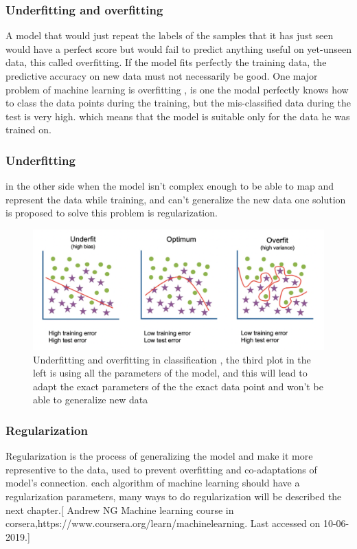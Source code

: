 \subsubsection{Underfitting and overfitting}
A model that would just repeat the labels of the samples that it has just seen would have a perfect score but would fail to predict anything useful on yet-unseen data, this called overfitting. If the model fits perfectly the training data, the predictive accuracy on new data must not necessarily be good. One major problem of machine learning is overfitting , is one the modal perfectly knows how to class the data points during the training, but the mis-classified data during the test is very high. which means that the model is suitable only for the data he was trained on. 
\subsubsection{Underfitting}
in the other side when the model isn’t complex enough to be able to map and represent the data while training, and can’t generalize the new data one solution is proposed to solve this problem is regularization.\cite{book3}
\begin{figure}[!h]
    \centering
    \includegraphics[width=1\textwidth]{chapters/chapter02/fig02/overfiting.png}
    \caption{Underfitting and overfitting in classification , the third plot in the left is using all the parameters of the model, and this will lead to adapt the exact parameters of the the exact data point and won’t be able to generalize new data
}
    \label{fig:my_label}
\end{figure}
\subsubsection{Regularization}
Regularization is the process of generalizing the model and make it more representive to the data, used to prevent overfitting and co-adaptations of model’s connection. each algorithm of machine learning should have a regularization parameters, many ways to do regularization will be described the next chapter.[ Andrew NG Machine learning course in corsera,https://www.coursera.org/learn/machinelearning.
Last accessed on 10-06-2019.]
